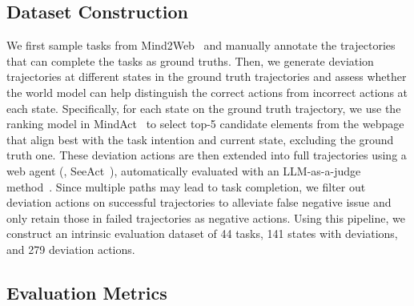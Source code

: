 \subsection{Dataset Construction}

We first sample tasks from Mind2Web~\citep{mind2web} and manually annotate the trajectories that can complete the tasks as ground truths. Then, we generate deviation trajectories at different states in the ground truth trajectories and assess whether the world model can help distinguish the correct actions from incorrect actions at each state. Specifically, for each state on the ground truth trajectory, we use the ranking model in MindAct~\citep{mind2web} to select top-5 candidate elements from the webpage that align best with the task intention and current state, excluding the ground truth one. These deviation actions are then extended into full trajectories using a web agent (\ie, SeeAct~\citep{zheng2024seeact}), automatically evaluated with an LLM-as-a-judge method~\citep{pan2024autonomous}.
Since multiple paths may lead to task completion, we filter out deviation actions on successful trajectories to alleviate false negative issue and only retain those in failed trajectories as negative actions. Using this pipeline, we construct an intrinsic evaluation dataset of 44 tasks, 141 states with deviations, and 279 deviation actions.

\subsection{Evaluation Metrics}

